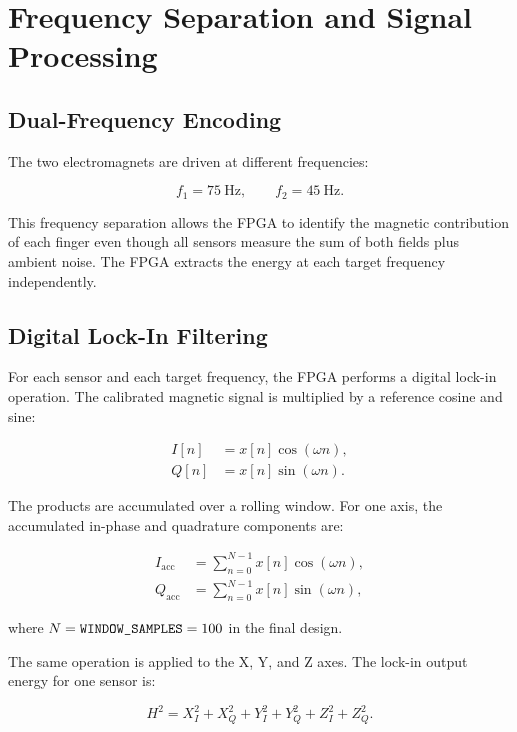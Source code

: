 \section{Frequency Separation and Signal Processing}
\label{sec:signal_processing}

\subsection{Dual-Frequency Encoding}

The two electromagnets are driven at different frequencies:

\begin{equation}
    f_1 = 75~\mathrm{Hz}, \qquad f_2 = 45~\mathrm{Hz}.
\end{equation}

This frequency separation allows the FPGA to identify the magnetic contribution of each finger even though all sensors measure the sum of both fields plus ambient noise. The FPGA extracts the energy at each target frequency independently.

\subsection{Digital Lock-In Filtering}

For each sensor and each target frequency, the FPGA performs a digital lock-in operation. The calibrated magnetic signal is multiplied by a reference cosine and sine:

\begin{align}
    I[n] &= x[n]\cos(\omega n), \\
    Q[n] &= x[n]\sin(\omega n).
\end{align}

The products are accumulated over a rolling window. For one axis, the accumulated in-phase and quadrature components are:

\begin{align}
    I_{\mathrm{acc}} &= \sum_{n=0}^{N-1} x[n]\cos(\omega n), \\
    Q_{\mathrm{acc}} &= \sum_{n=0}^{N-1} x[n]\sin(\omega n),
\end{align}

where $N=\texttt{WINDOW\_SAMPLES}=100$ in the final design.

The same operation is applied to the X, Y, and Z axes. The lock-in output energy for one sensor is:

\begin{equation}
    H^2 =
    X_I^2 + X_Q^2 +
    Y_I^2 + Y_Q^2 +
    Z_I^2 + Z_Q^2.
    \label{eq:h2_lockin}
\end{equation}

